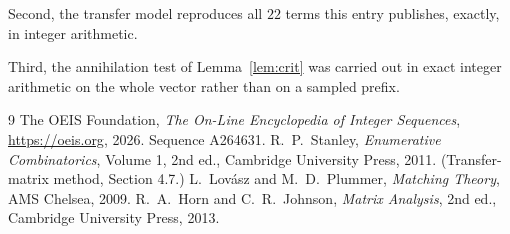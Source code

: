 \documentclass[11pt,a4paper]{article}
\theoremstyle{plain}
\theoremstyle{definition}
\begin{document}
Second, the transfer model reproduces all $22$ terms this entry publishes, exactly, in
integer arithmetic.

Third, the annihilation test of Lemma~\ref{lem:crit} was carried out in exact integer
arithmetic on the whole vector rather than on a sampled prefix.

\begin{thebibliography}{9}
 The OEIS Foundation, \emph{The On-Line Encyclopedia of Integer
Sequences}, \url{https://oeis.org}, 2026. Sequence A264631.
 R.~P.~Stanley, \emph{Enumerative Combinatorics}, Volume 1, 2nd ed.,
Cambridge University Press, 2011. (Transfer-matrix method, Section 4.7.)
 L.~Lov\'asz and M.~D.~Plummer, \emph{Matching Theory}, AMS Chelsea, 2009.
 R.~A.~Horn and C.~R.~Johnson, \emph{Matrix Analysis}, 2nd ed., Cambridge
University Press, 2013.
\end{thebibliography}
\end{document}
